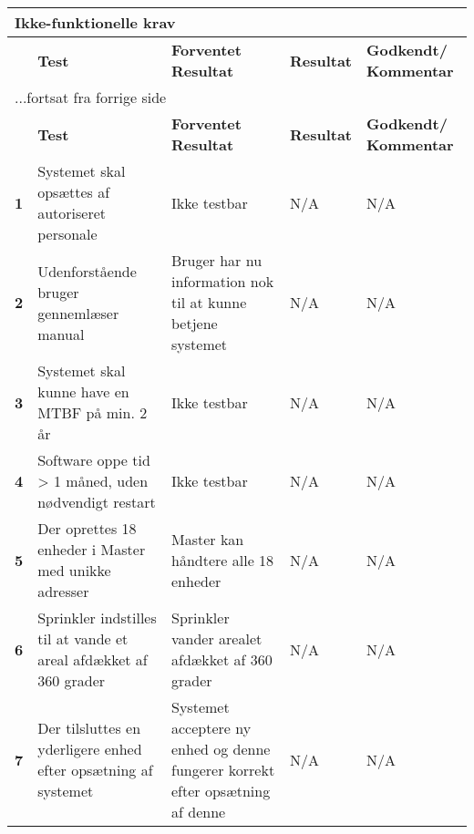 \begin{center}
\begin{longtable}{|p{}|p{}|p{}|p{}|p{}|} %
\hline
\multicolumn{5}{|l|}{\textbf{Ikke-funktionelle krav}} \\ \hline
\multicolumn{1}{|c|}{} &
\textbf{Test} &
\textbf{Forventet \newline Resultat} &
\textbf{Resultat} &
\textbf{Godkendt/ \newline Kommentar} \\ \hline 
\endfirsthead

\multicolumn{5}{l}{...fortsat fra forrige side} \\ \hline 
\multicolumn{1}{|c|}{} &
\textbf{Test} &
\textbf{Forventet \newline Resultat} &
\textbf{Resultat} &
\textbf{Godkendt/ \newline Kommentar} \\ \hline 
\endhead

\textbf{1}	&Systemet skal opsættes af autoriseret personale
			&Ikke testbar
			&N/A
			&N/A \\ \hline 
			
\textbf{2}	&Udenforstående bruger gennemlæser manual
			&Bruger har nu information nok til at kunne betjene systemet
			&N/A
			&N/A \\ \hline 
			
\textbf{3}	&Systemet skal kunne have en MTBF på min. 2 år
			&Ikke testbar
			&N/A
			&N/A \\ \hline 
			
\textbf{4}	&Software oppe tid > 1 måned, uden nødvendigt restart
			&Ikke testbar
			&N/A
			&N/A \\ \hline 
			
\textbf{5}	&Der oprettes 18 enheder i Master med unikke adresser
			&Master kan håndtere alle 18 enheder
			&N/A
			&N/A \\ \hline 
			
\textbf{6}	&Sprinkler indstilles til at vande et areal afdækket af 360 grader
			&Sprinkler vander arealet afdækket af 360 grader
			&N/A
			&N/A \\ \hline 
			
\textbf{7}	&Der tilsluttes en yderligere enhed efter opsætning af systemet
			&Systemet acceptere ny enhed og denne fungerer korrekt efter opsætning af denne
			&N/A
			&N/A \\ \hline 
			

\end{longtable}
\end{center}
